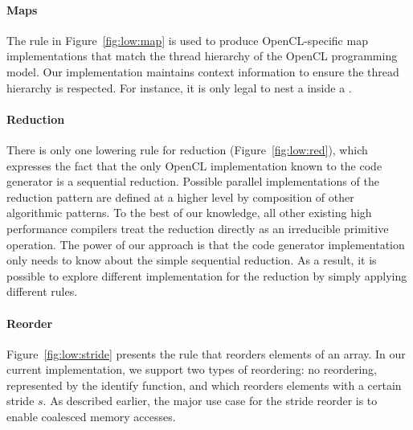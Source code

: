 \paragraph{Maps}
The rule in Figure~\ref{fig:low:map} is used to produce OpenCL-specific map implementations that match the thread hierarchy of the OpenCL programming model.
Our implementation maintains context information to ensure the thread hierarchy is respected.
For instance, it is only legal to nest a  inside a .



\paragraph{Reduction}
There is only one lowering rule for reduction (Figure~\ref{fig:low:red}), which expresses the fact that the only OpenCL implementation known to the code generator is a sequential reduction.
Possible parallel implementations of the reduction pattern are defined at a higher level by composition of other algorithmic patterns.
To the best of our knowledge, all other existing high performance compilers treat the reduction directly as an irreducible primitive operation.
The power of our approach is that the code generator implementation only needs to know about the simple sequential reduction.
As a result, it is possible to explore different implementation for the reduction by simply applying different rules.

\paragraph{Reorder}
Figure~\ref{fig:low:stride} presents the rule that reorders elements of an array.
In our current implementation, we support two types of reordering:
no reordering, represented by the  identify function, and  which reorders elements with a certain stride $s$.
As described earlier, the major use case for the stride reorder is to enable coalesced memory accesses.


